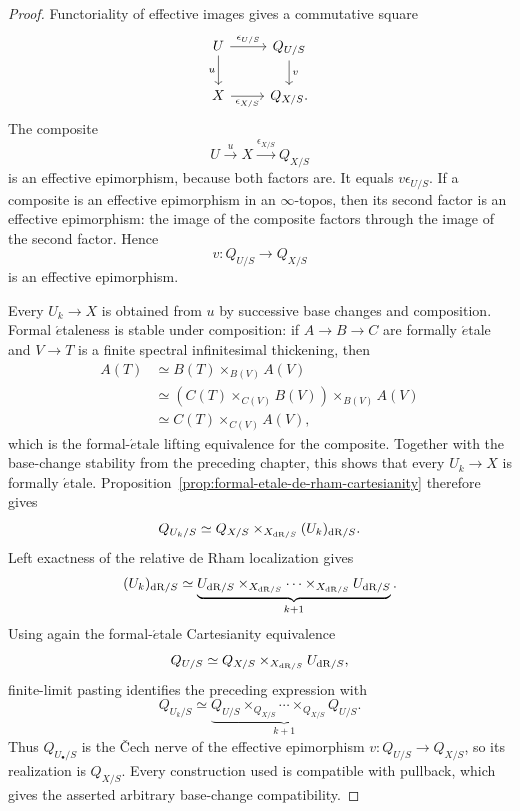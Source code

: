 \begin{proof}
Functoriality of effective images gives a commutative square
\[
\begin{tikzcd}
    U \ar[r,"\epsilon_{U/S}"] \ar[d,"u"']
    & Q_{U/S} \ar[d,"v"]
    \\
    X \ar[r,"\epsilon_{X/S}"']
    & Q_{X/S}.
\end{tikzcd}
\]
The composite
\[
    U\xrightarrow{u}X\xrightarrow{\epsilon_{X/S}}Q_{X/S}
\]
is an effective epimorphism, because both factors are.  It equals
\(v\epsilon_{U/S}\).  If a composite is an effective epimorphism in an \(\infty\)-topos, then its
second factor is an effective epimorphism: the image of the composite factors through the image of
the second factor.  Hence
\[
    v:Q_{U/S}\longrightarrow Q_{X/S}
\]
is an effective epimorphism.

Every \(U_k\to X\) is obtained from \(u\) by successive base changes and composition.  Formal
\(\acute{e}\)taleness is stable under composition: if \(A\to B\to C\) are formally
\(\acute{e}\)tale and \(V\to T\) is a finite spectral infinitesimal thickening, then
\[
\begin{aligned}
    A(T)
    &\simeq
    B(T)\times_{B(V)}A(V)
    \\
    &\simeq
    \left(C(T)\times_{C(V)}B(V)\right)\times_{B(V)}A(V)
    \\
    &\simeq
    C(T)\times_{C(V)}A(V),
\end{aligned}
\]
which is the formal-\(\acute{e}\)tale lifting equivalence for the composite.  Together with the
base-change stability from the preceding chapter, this shows that every \(U_k\to X\) is formally
\(\acute{e}\)tale.  Proposition~\ref{prop:formal-etale-de-rham-cartesianity} therefore gives
\[
    Q_{U_k/S}
    \simeq
    Q_{X/S}\times_{X_{\mathrm{dR}/S}}(U_k)_{\mathrm{dR}/S}.
\]
Left exactness of the relative de Rham localization gives
\[
    (U_k)_{\mathrm{dR}/S}
    \simeq
    \underbrace{
        U_{\mathrm{dR}/S}\times_{X_{\mathrm{dR}/S}}\cdots\times_{X_{\mathrm{dR}/S}}U_{\mathrm{dR}/S}
    }_{k+1}.
\]
Using again the formal-\(\acute{e}\)tale Cartesianity equivalence
\[
    Q_{U/S}
    \simeq
    Q_{X/S}\times_{X_{\mathrm{dR}/S}}U_{\mathrm{dR}/S},
\]
finite-limit pasting identifies the preceding expression with
\[
    Q_{U_k/S}
    \simeq
    \underbrace{
        Q_{U/S}\times_{Q_{X/S}}\cdots\times_{Q_{X/S}}Q_{U/S}
    }_{k+1}.
\]
Thus \(Q_{U_\bullet/S}\) is the \v{C}ech nerve of the effective epimorphism
\(v:Q_{U/S}\to Q_{X/S}\), so its realization is \(Q_{X/S}\).  Every construction used is compatible
with pullback, which gives the asserted arbitrary base-change compatibility.
\end{proof}

